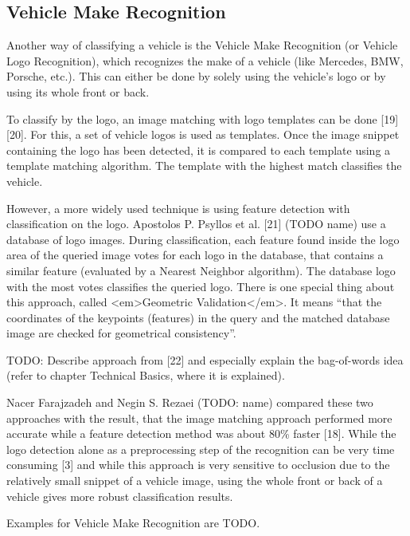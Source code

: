\subsection{Vehicle Make Recognition}
Another way of classifying a vehicle is the Vehicle Make Recognition (or Vehicle Logo Recognition), which recognizes the make of a vehicle (like Mercedes, BMW, Porsche, etc.). This can either be done by solely using the vehicle’s logo or by using its whole front or back.

To classify by the logo, an image matching with logo templates can be done [19] [20]. For this, a set of vehicle logos is used as templates. Once the image snippet containing the logo has been detected, it is compared to each template using a template matching algorithm. The template with the highest match classifies the vehicle.

However, a more widely used technique is using feature detection with classification on the logo. Apostolos P. Psyllos et al. [21] (TODO name) use a database of logo images. During classification, each feature found inside the logo area of the queried image votes for each logo in the database, that contains a similar feature (evaluated by a Nearest Neighbor algorithm). The database logo with the most votes classifies the queried logo. There is one special thing about this approach, called <em>Geometric Validation</em>. It means “that the coordinates of the keypoints (features) in the query and the matched database image are checked for geometrical consistency”.

TODO: Describe approach from [22] and especially explain the bag-of-words idea (refer to chapter Technical Basics, where it is explained).

Nacer Farajzadeh and Negin S. Rezaei (TODO: name) compared these two approaches with the result, that the image matching approach performed more accurate while a feature detection method was about 80\% faster [18]. While the logo detection alone as a preprocessing step of the recognition can be very time consuming [3] and while this approach is very sensitive to occlusion due to the relatively small snippet of a vehicle image, using the whole front or back of a vehicle gives more robust classification results.

Examples for Vehicle Make Recognition are TODO.


